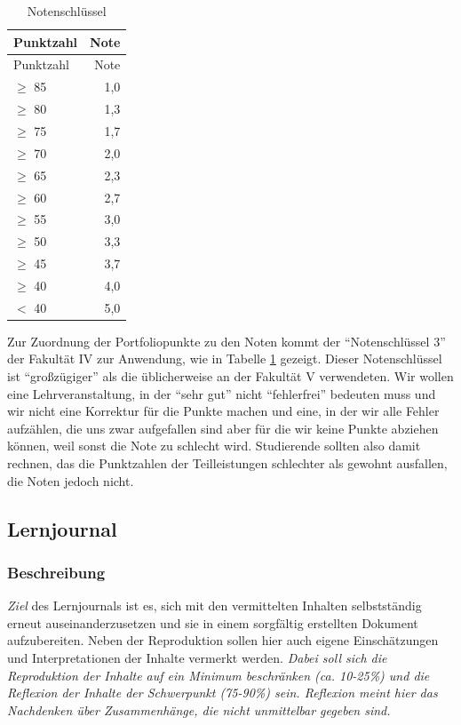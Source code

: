 \documentclass[DIV=15,headinclude=true]{scrartcl}
\begin{document}
\begin{table}\centering
	\label{tab:notenschluessel}
	\caption{Notenschlüssel}
	\begin{tabular}{lr}
		\toprule
		Punktzahl   & Note \\
		\midrule
		Punktzahl   & Note \\
		\(\geq\) 85 & 1,0  \\
		\(\geq\) 80 & 1,3  \\
		\(\geq\) 75 & 1,7  \\
		\(\geq\) 70 & 2,0  \\
		\(\geq\) 65 & 2,3  \\
		\(\geq\) 60 & 2,7  \\
		\(\geq\) 55 & 3,0  \\
		\(\geq\) 50 & 3,3  \\
		\(\geq\) 45 & 3,7  \\
		\(\geq\) 40 & 4,0  \\
		\(<\) 40    & 5,0  \\
		\bottomrule
	\end{tabular}
\end{table}

Zur Zuordnung der Portfoliopunkte zu den Noten kommt der
\enquote{Notenschlüssel 3} der Fakultät IV zur Anwendung, wie in Tabelle
\ref{tab:notenschluessel} gezeigt. Dieser
Notenschlüssel ist \enquote{großzügiger} als die üblicherweise an der
Fakultät V verwendeten. Wir wollen eine Lehrveranstaltung, in der
\enquote{sehr gut} nicht \enquote{fehlerfrei} bedeuten muss und wir
nicht eine Korrektur für die Punkte machen und eine, in der wir alle
Fehler aufzählen, die uns zwar aufgefallen sind aber für die wir keine
Punkte abziehen können, weil sonst die Note zu schlecht wird.
Studierende sollten also damit rechnen, das die Punktzahlen der
Teilleistungen schlechter als gewohnt ausfallen, die Noten jedoch nicht.

\subsection{Lernjournal}

\subsubsection{Beschreibung}

\emph{Ziel} des Lernjournals ist es, sich mit den vermittelten Inhalten
selbstständig erneut auseinanderzusetzen und sie in einem sorgfältig
erstellten Dokument aufzubereiten. Neben der Reproduktion sollen hier
auch eigene Einschätzungen und Interpretationen der Inhalte vermerkt
werden. \emph{Dabei soll sich die Reproduktion der Inhalte auf ein Minimum
	beschränken (ca. 10-25\%) und die Reflexion der Inhalte der Schwerpunkt
	(75-90\%) sein. Reflexion meint hier das Nachdenken über Zusammenhänge,
	die nicht unmittelbar gegeben sind.}
\end{document}
